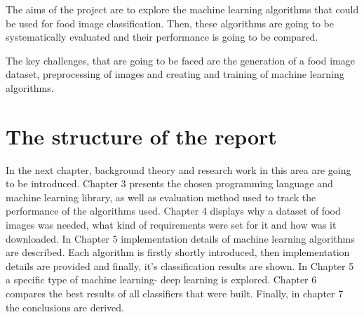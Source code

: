 The aims of the project are to explore the machine learning algorithms that could be used for food image classification.
Then, these algorithms are going to be systematically evaluated and their performance is going to be compared.

The key challenges, that are going to be faced are the generation of a food image dataset, preprocessing of images and creating and training of machine learning algorithms.

\section{The structure of the report}
In the next chapter, background theory and research work in this area are going to be introduced. Chapter 3 presents the chosen programming language and machine learning library, as well as evaluation method used to track the performance of the algorithms used. Chapter 4 displays why a dataset of food images was needed, what kind of requirements were set for it and how was it downloaded. In Chapter 5 implementation details of machine learning algorithms are described. Each algorithm is firstly shortly introduced, then implementation details are provided and finally, it's classification results are shown.  In Chapter 5 a specific type of machine learning- deep learning is explored. Chapter 6 compares the best results of all classifiers that were built. Finally, in chapter 7 the conclusions are derived.